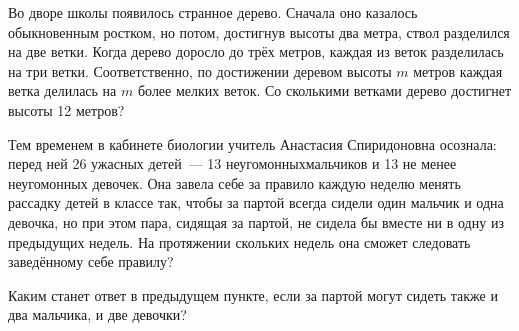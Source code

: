 ﻿
\begin{itemize}

\itA Во дворе школы появилось странное дерево. Сначала оно казалось обыкновенным ростком, но потом, достигнув высоты два метра, ствол разделился на две ветки. Когда дерево доросло до трёх метров, каждая из веток разделилась на три ветки. Соответственно, по достижении деревом высоты $m$ метров каждая ветка делилась на $m$ более мелких веток. Со сколькими ветками дерево достигнет высоты 12 метров?

\itB Тем временем в кабинете биологии учитель Анастасия Спиридоновна осознала: перед ней 26 ужасных детей~— 13 неугомонных\linebreak мальчиков и 13 не менее неугомонных девочек. Она завела себе за правило каждую неделю менять рассадку детей в классе так, чтобы за партой всегда сидели один мальчик и одна девочка, но при этом пара, сидящая за партой, не сидела бы вместе ни в одну из предыдущих недель. На протяжении скольких недель она сможет следовать заведённому себе правилу?

\itC Каким станет ответ в предыдущем пункте, если за партой могут сидеть также и два мальчика, и две девочки?
\end{itemize}